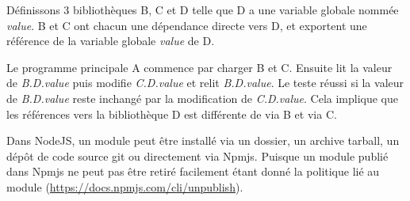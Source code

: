 Définissons 3 bibliothèques B, C et D telle que D a une variable globale nommée \textit{value}.
B et C ont chacun une dépendance directe vers D, et exportent une référence de la variable
globale \textit{value} de D.

Le programme principale A commence par charger B et C. Ensuite lit la valeur de \textit{B.D.value}
puis modifie \textit{C.D.value} et relit \textit{B.D.value}. Le teste réussi si la valeur de
\textit{B.D.value} reste inchangé par la modification de \textit{C.D.value}. Cela implique que
les références vers la bibliothèque D est différente de via B et via C.

Dans NodeJS, un module peut être installé via un dossier, un archive tarball, un dépôt de code source git ou
directement via Npmjs. Puisque un module publié dans Npmjs ne peut pas être retiré facilement étant donné
la politique lié au module (\url{https://docs.npmjs.com/cli/unpublish}).
